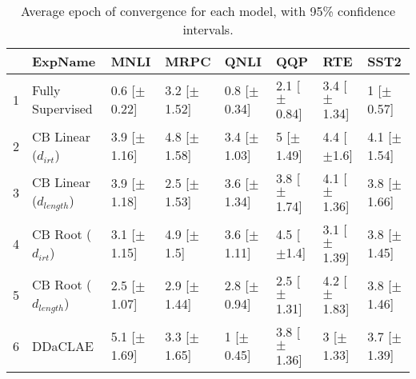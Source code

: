 \begin{table*}[ht]
\centering
\begingroup\small
\begin{tabular}{rlllllll}
  \hline
 & ExpName & MNLI & MRPC & QNLI & QQP & RTE & SST2 \\ 
  \hline
1 & Fully Supervised & 0.6 [$\pm$0.22] & 3.2 [$\pm$1.52] & 0.8 [$\pm$0.34] & 2.1 [$\pm$0.84] & 3.4 [$\pm$1.34] & 1 [$\pm$0.57] \\ 
  2 & CB Linear ($d_{irt}$) & 3.9 [$\pm$1.16] & 4.8 [$\pm$1.58] & 3.4 [$\pm$1.03] & 5 [$\pm$1.49] & 4.4 [$\pm$1.6] & 4.1 [$\pm$1.54] \\ 
  3 & CB Linear ($d_{length}$) & 3.9 [$\pm$1.18] & 2.5 [$\pm$1.53] & 3.6 [$\pm$1.34] & 3.8 [$\pm$1.74] & 4.1 [$\pm$1.36] & 3.8 [$\pm$1.66] \\ 
  4 & CB Root ($d_{irt}$) & 3.1 [$\pm$1.15] & 4.9 [$\pm$1.5] & 3.6 [$\pm$1.11] & 4.5 [$\pm$1.4] & 3.1 [$\pm$1.39] & 3.8 [$\pm$1.45] \\ 
  5 & CB Root ($d_{length}$) & 2.5 [$\pm$1.07] & 2.9 [$\pm$1.44] & 2.8 [$\pm$0.94] & 2.5 [$\pm$1.31] & 4.2 [$\pm$1.83] & 3.8 [$\pm$1.46] \\ 
  6 & DDaCLAE & 5.1 [$\pm$1.69] & 3.3 [$\pm$1.65] & 1 [$\pm$0.45] & 3.8 [$\pm$1.36] & 3 [$\pm$1.33] & 3.7 [$\pm$1.39] \\ 
   \hline
\end{tabular}
\endgroup
\caption{Average epoch of convergence for each model, with 95\% confidence intervals.} 
\label{tab:epoch_bert-False}
\end{table*}
